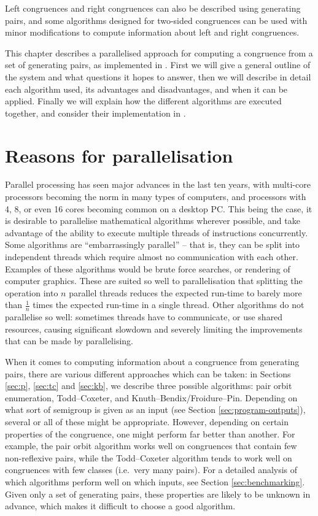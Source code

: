 Left congruences and right congruences can also be described using generating
pairs, and some algorithms designed for two-sided congruences can be used with
minor modifications to compute information about left and right congruences.

This chapter describes a parallelised approach for computing a congruence from a
set of generating pairs, as implemented in \libsemigroups{}
\cite{libsemigroups}.  First we will give a general outline of the system
and what questions it hopes to answer, then we will describe in detail each
algorithm used, its advantages and disadvantages, and when it can be applied.
Finally we will explain how the different algorithms are executed together, and
consider their implementation in \cite{libsemigroups}.

\section{Reasons for parallelisation}

Parallel processing has seen major advances in the last ten years, with
multi-core processors becoming the norm in many types of computers, and
processors with 4, 8, or even 16 cores becoming common on a desktop PC.  This
being the case, it is desirable to parallelise mathematical algorithms wherever
possible, and take advantage of the ability to execute multiple
threads of instructions concurrently.  Some algorithms
are ``embarrassingly parallel'' -- that is, they can be split into
independent threads which require almost no communication with each other.
Examples of these algorithms would be brute force searches, or rendering of
computer graphics.
These are suited so well to parallelisation that splitting the operation into
$n$ parallel threads reduces the expected run-time to barely more than
$\frac{1}{n}$ times the expected run-time in a single thread.  Other
algorithms do not parallelise so well: sometimes threads have to communicate, or
use shared resources, causing significant slowdown and severely limiting the
improvements that can be made by parallelising.

When it comes to computing information about a congruence from generating pairs,
there are various different approaches which can be taken: in Sections
\ref{sec:p}, \ref{sec:tc} and \ref{sec:kb}, we describe three possible
algorithms: pair orbit enumeration, Todd--Coxeter, and Knuth--Bendix/Froidure--Pin.
Depending on what sort of semigroup is given as an input (see Section
\ref{sec:program-outputs}), several
or all of these might be appropriate.  However, depending on certain properties
of the congruence, one might perform far better than another.  For example, the
pair orbit algorithm works well on congruences that contain few non-reflexive
pairs, while the Todd--Coxeter algorithm tends to work well on congruences with
few classes (i.e.~very many pairs).  For a detailed analysis of which algorithms
perform well on which inputs, see Section \ref{sec:benchmarking}.  Given
only a set of generating pairs, these properties are likely to be unknown in
advance, which makes it difficult to choose a good algorithm.


